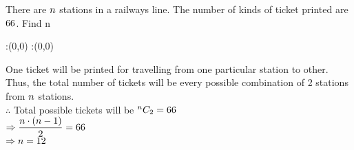 



\question[4] There are $n$ stations in a railways line. The number of kinds of ticket printed are $66$. Find n   


\watchout

\ifprintanswers
  \begin{marginfigure}
      :(0,0)
      :(0,0)
    \figdrawbegin{}
      \figdrawline [100,101]
    \figdrawend
    \figvisu{\figBoxA}{}{%
    }
    \centerline{\box\figBoxA}
  \end{marginfigure}
\fi 

\begin{solution}[\mcq]
One ticket will be printed for travelling from one particular station to other. Thus, the total number of tickets will be every possible combination of 2 stations from 
$n$ stations. \\
$\therefore$ Total possible tickets will be $^{n}C_{2} = 66$\\ 
$\Rightarrow \dfrac{n\cdot (n-1)}{2} = 66$\\
$\Rightarrow n = 12$
\end{solution}



